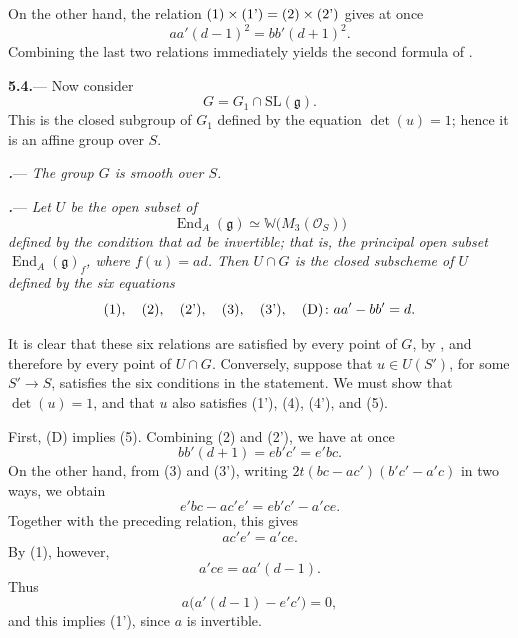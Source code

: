 On the other hand, the relation
\(\textup{(1)}\times\textup{(1')}=
\textup{(2)}\times\textup{(2')}\) gives at once
\[
  aa'(d-1)^2=bb'(d+1)^2.
\]
Combining the last two relations immediately yields the second
formula of .

\par\medskip\noindent
\textbf{5.4.}---
Now consider
\[
  G=G_1\cap\mathrm{SL}(\mathfrak g).
\]
This is the closed subgroup of \(G_1\) defined by the equation
\(\det(u)=1\); hence it is an affine group over \(S\).

\par\medskip\noindent
{}\textbf{\textit{.}}---
\textit{The group \(G\) is smooth over \(S\).}

\par\medskip\noindent
\textbf{\textit{.}}---
\textit{Let \(U\) be the open subset of}
\[
  \operatorname{End}_A(\mathfrak g)
  \simeq
  \mathbb W\bigl(M_3(\mathcal O_S)\bigr)
\]
\textit{defined by the condition that \(ad\) be invertible; that is,
the principal open subset
\(\operatorname{End}_A(\mathfrak g)_f\), where
\(f(u)=ad\).  Then \(U\cap G\) is the closed subscheme of \(U\)
defined by the six equations}
\[
  \textup{(1)},\quad
  \textup{(2)},\quad
  \textup{(2')},\quad
  \textup{(3)},\quad
  \textup{(3')},\quad
  \textup{(D)}\colon aa'-bb'=d.
\]

It is clear that these six relations are satisfied by every point
of \(G\), by , and therefore by every point of \(U\cap G\).
Conversely, suppose that \(u\in U(S')\), for some \(S'\to S\),
satisfies the six conditions in the statement.  We must show that
\(\det(u)=1\), and that \(u\) also satisfies \textup{(1')},
\textup{(4)}, \textup{(4')}, and \textup{(5)}.

First, \textup{(D)} implies \textup{(5)}.  Combining \textup{(2)}
and \textup{(2')}, we have at once
\[
  bb'(d+1)=eb'c'=e'bc.
\]
On the other hand, from \textup{(3)} and \textup{(3')}, writing
\(2t(bc-ac')(b'c'-a'c)\) in two ways, we obtain
\[
  e'bc-ac'e'=eb'c'-a'ce.
\]
Together with the preceding relation, this gives
\[
  ac'e'=a'ce.
\]
By \textup{(1)}, however,
\[
  a'ce=aa'(d-1).
\]
Thus
\[
  a\bigl(a'(d-1)-e'c'\bigr)=0,
\]
and this implies \textup{(1')}, since \(a\) is invertible.

